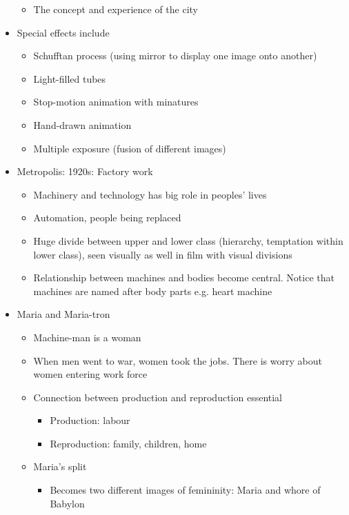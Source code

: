 \documentclass[11pt,fleqn]{book}
\begin{document}
\begin{descriptions}
\begin{itemize}
\begin{itemize}
            \item The concept and experience of the city
        \end{itemize}
        \item Special effects include
        \begin{itemize}
            \item Schufftan process (using mirror to display one image onto another)
            \item Light-filled tubes
            \item Stop-motion animation with minatures
            \item Hand-drawn animation
            \item Multiple exposure (fusion of different images)
        \end{itemize}
        \item Metropolis: 1920s: Factory work
        \begin{itemize}
            \item Machinery and technology has big role in peoples' lives
            \item Automation, people being replaced
            \item Huge divide between upper and lower class (hierarchy, temptation within lower class), seen visually as well in film with visual divisions
            \item Relationship between machines and bodies become central. Notice that machines are named after body parts e.g. heart machine
        \end{itemize} 
        \item Maria and Maria-tron
        \begin{itemize}
            \item Machine-man is a woman
            \item When men went to war, women took the jobs. There is worry about women entering work force
            \item Connection between production and reproduction essential
            \begin{itemize}
                \item Production: labour
                \item Reproduction: family, children, home
            \end{itemize}
            \item Maria's split
            \begin{itemize}
                \item Becomes two different images of femininity: Maria and whore of Babylon

\end{itemize}
\end{itemize}
\end{itemize}
\end{descriptions}
\end{document}
